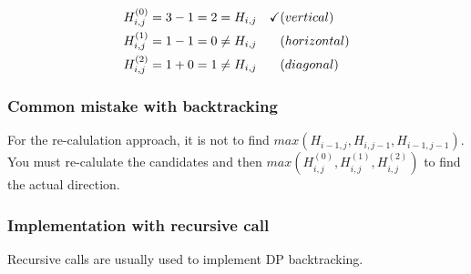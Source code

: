 \begin{align*}
H_{i,j}^{(0)} &= 3 - 1 = 2 = H_{i,j} &\checkmark & (vertical) \\
H_{i,j}^{(1)} &= 1 - 1 = 0 \neq H_{i,j} &\hfill & (horizontal) \\
H_{i,j}^{(2)} &= 1 + 0 = 1 \neq H_{i,j} &\hfill  & (diagonal)
\end{align*}

%
%
\subsubsection*{Common mistake with backtracking}
For the re-calulation approach, it is not to find $max(H_{i-1,j}, H_{i,j-1}, H_{i-1,j-1})$. You must re-calulate the candidates and then $max(H_{i,j}^{(0)}, H_{i,j}^{(1)} , H_{i,j}^{(2)})$ to find the actual direction.

%
%
\subsubsection*{Implementation with recursive call}
Recursive calls are usually used to implement DP backtracking.

